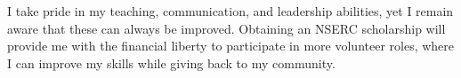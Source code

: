 \documentclass[a4paper,12pt]{article}
\begin{document}
I take pride in my teaching, communication, and leadership abilities, yet I
remain aware that these can always be improved.
Obtaining an NSERC scholarship will provide me with the financial liberty to
participate in more volunteer roles, where I can improve my skills while giving back to my
community.
\end{document}
